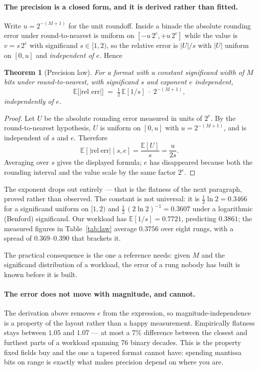 \documentclass[11pt]{article}
\newtheorem{theorem}{Theorem}
\theoremstyle{definition}
\begin{document}
\paragraph{The precision is a closed form, and it is derived rather than fitted.}
Write $u = 2^{-(M+1)}$ for the unit roundoff. Inside a binade the absolute
rounding error under round-to-nearest is uniform on $[-u\,2^{e}, +u\,2^{e}]$
while the value is $v = s\,2^{e}$ with significand $s \in [1,2)$, so the relative
error is $|U|/s$ with $|U|$ uniform on $[0,u]$ and \emph{independent of $e$}.
Hence
\begin{theorem}[Precision law]\label{thm:law}
For a format with a constant significand width of $M$ bits under
round-to-nearest, with significand $s$ and exponent $e$ independent,
\[
  \mathbb{E}\bigl[|\text{rel err}|\bigr] \;=\; \tfrac{1}{2}\,\mathbb{E}[1/s]\;\cdot\;2^{-(M+1)} ,
\]
independently of $e$.
\end{theorem}
\begin{proof}
Let $U$ be the absolute rounding error measured in units of $2^e$.  By the
round-to-nearest hypothesis, $U$ is uniform on $[0,u]$ with
$u=2^{-(M+1)}$, and is independent of $s$ and $e$.  Therefore
\[
  \mathbb{E}[|\mathrm{rel\ err}|\mid s,e]
  = \frac{\mathbb{E}[U]}{s}
  = \frac{u}{2s}.
\]
Averaging over $s$ gives the displayed formula; $e$ has disappeared because both
the rounding interval and the value scale by the same factor $2^e$.
\end{proof}
The exponent drops out entirely --- that is the flatness of the next paragraph,
proved rather than observed. The constant is not universal: it is
$\tfrac{1}{2}\ln 2 = 0.3466$ for a significand uniform on $[1,2)$ and
$\tfrac{1}{2}\,(2\ln 2)^{-1} = 0.3607$ under a logarithmic (Benford) significand.
Our workload has $\mathbb{E}[1/s] = 0.7721$, predicting $0.3861$; the measured
figures in Table~\ref{tab:law} average $0.3756$ over eight rungs, with a spread
of $0.369$--$0.390$ that brackets it.

The practical consequence is the one a reference needs: given $M$ and the
significand distribution of a workload, the error of a rung nobody has built is
known before it is built.

\paragraph{The error does not move with magnitude, and cannot.} The derivation
above removes $e$ from the expression, so magnitude-independence is a property of
the layout rather than a happy measurement. Empirically flatness stays between
$1.05$ and $1.07$ --- at most a $7\%$ difference between the closest and furthest
parts of a workload spanning 76 binary decades. This is the property fixed fields
buy and the one a tapered format cannot have: spending mantissa bits on range is
exactly what makes precision depend on where you are.
\end{document}
